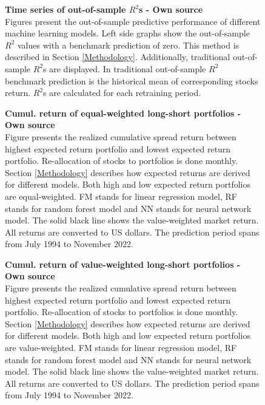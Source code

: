 \documentclass[12pt]{article}
\begin{document}
\begin{appendices}
\begin{figure}[H]
\centering
\caption[Time series of out-of-sample $R^2$]{\textbf{Time series of out-of-sample \boldmath$R^2$s \textnormal{- Own source}}\\ Figures present the out-of-sample predictive performance of different machine learning models. Left side graphs show the out-of-sample $R^2$ values with a benchmark prediction of zero. This method is described in Section \ref{Methodology}. Additionally, traditional out-of-sample $R^2$s are displayed. In traditional out-of-sample $R^2$ benchmark prediction is the historical mean of corresponding stocks return. $R^2$s are calculated for each retraining period.}

\label{plot:OOSR2_ts}
\end{figure}

\begin{figure}[H]
\centering
\caption[Cumulative return of equal-weighted long-short portfolios]{\textbf{Cumul. return of equal-weighted long-short portfolios \textnormal{- Own source}}\\ Figure presents the realized cumulative spread return between highest expected return portfolio and lowest expected return portfolio. Re-allocation of stocks to portfolios is done monthly. Section \ref{Methodology} describes how expected returns are derived for different models. Both high and low expected return portfolios are equal-weighted. FM stands for linear regression model, RF stands for random forest model and NN stands for neural network model. The solid black line shows the value-weighted market return. All returns are converted to US dollars. The prediction period spans from July 1994 to November 2022.}

\label{plot:cumul_ew_LS_portf_return}
\end{figure}

\begin{figure}[H]
\centering
\caption[Cumulative return of value-weighted long-short portfolios]{\textbf{Cumul. return of value-weighted long-short portfolios \textnormal{- Own source}}\\ Figure presents the realized cumulative spread return between highest expected return portfolio and lowest expected return portfolio. Re-allocation of stocks to portfolios is done monthly. Section \ref{Methodology} describes how expected returns are derived for different models. Both high and low expected return portfolios are value-weighted. FM stands for linear regression model, RF stands for random forest model and NN stands for neural network model. The solid black line shows the value-weighted market return. All returns are converted to US dollars. The prediction period spans from July 1994 to November 2022.}

\label{plot:cumul_vw_LS_portf_return}
\end{figure}


\end{appendices}
\end{document}
